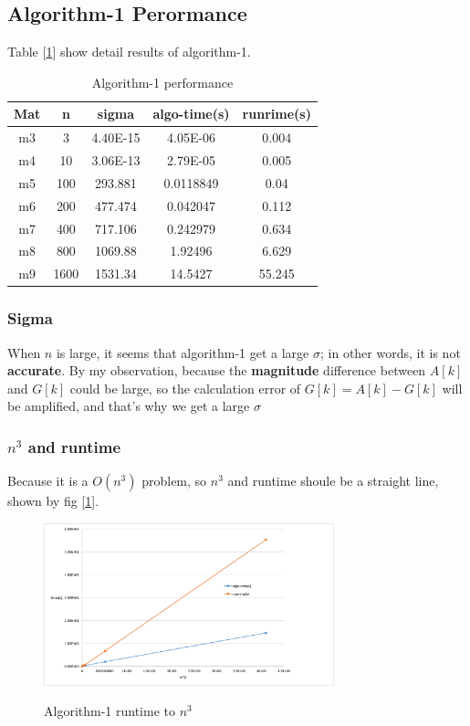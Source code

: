 \documentclass{article}
\begin{document}
\subsection{Algorithm-1 Perormance}
Table [\ref{tab:algo1}] show detail results of algorithm-1.
\begin{table}[h!]
    \centering
    \caption{Algorithm-1 performance}
    \begin{tabular}{|c|c|c|c|c|}
        \hline
        Mat & n   & sigma & algo-time(s) & runrime(s) \bigstrut\\
        \hline
        m3  & 3   & 4.40E-15 & 4.05E-06 & 0.004 \bigstrut\\
        \hline
        m4  & 10  & 3.06E-13 & 2.79E-05 & 0.005 \bigstrut\\
        \hline
        m5  & 100 & 293.881 & 0.0118849 & 0.04 \bigstrut\\
        \hline
        m6  & 200 & 477.474 & 0.042047 & 0.112 \bigstrut\\
        \hline
        m7  & 400 & 717.106 & 0.242979 & 0.634 \bigstrut\\
        \hline
        m8  & 800 & 1069.88 & 1.92496 & 6.629 \bigstrut\\
        \hline
        m9  & 1600 & 1531.34 & 14.5427 & 55.245 \bigstrut\\
        \hline
    \end{tabular}%

    \label{tab:algo1}
\end{table}%
\subsubsection{Sigma}
\label{sec:algo1-sigma}
When $n$ is large, it seems that algorithm-1 get a large $\sigma$; in other words, it is not \textbf{accurate}. By my observation,
because the \textbf{magnitude} difference between $A[k]$ and $G[k]$ could be large, so the calculation error of $G[k] = A[k] - G[k]$
will be amplified, and that's why we get a large {\boldmath$\sigma$}
\newpage
\subsubsection{$n^3$ and runtime}
Because it is a $O(n^3)$ problem, so $n^3$ and runtime shoule be a straight line, shown by fig [\ref{fig:algo1-runtime}].
\begin{figure}[H]
    \centering
    \caption{Algorithm-1 runtime to $n^3$}
    \includegraphics[width=0.75\textwidth]{src/algo1-runtime.png}
    \label{fig:algo1-runtime}
\end{figure}
\end{document}

